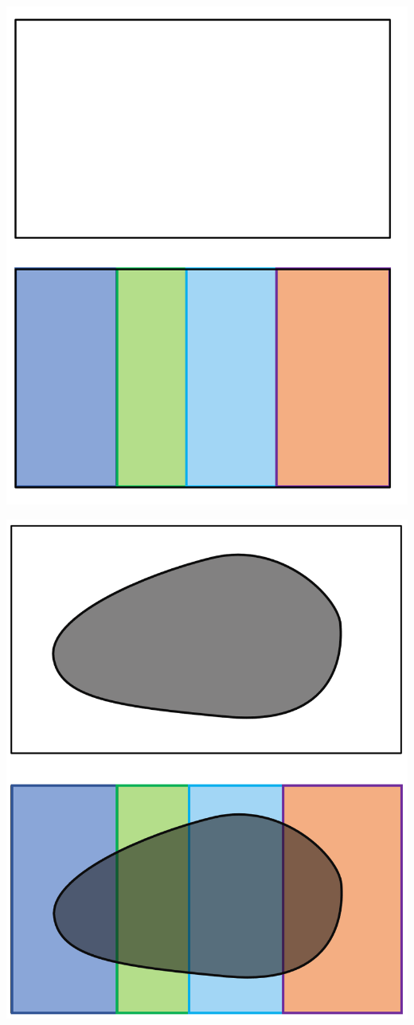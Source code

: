 \documentclass[compress]{beamer}
\begin{document}
\begin{frame}
\includegraphics[scale=.4]{figs/PartitionUnivSet.png}
\end{frame}
\begin{frame}
\includegraphics[scale=.4]{figs/PartitionOfE.png}
\end{frame}
\end{document}

